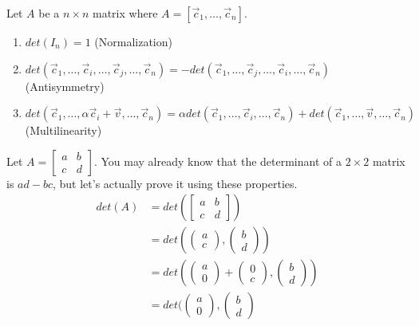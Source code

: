 Let $A$ be a $n\times n$ matrix where $A=[\vec{c}_1,\ldots,\vec{c}_n]$.
\begin{enumerate}
    \item $det(I_n)=1$ (Normalization)
    \item $det(\vec{c}_1,\ldots,\vec{c}_i,\ldots,\vec{c}_j,\ldots,\vec{c}_n)=-det(\vec{c}_1,\ldots,\vec{c}_j,\ldots,\vec{c}_i,\ldots,\vec{c}_n)$ (Antisymmetry)
    \item $det(\vec{c}_1,\ldots,
    \alpha\vec{c}_i+\vec{v},\ldots,\vec{c}_n)=\alpha det(\vec{c}_1,\ldots,
    \vec{c}_i,\ldots,\vec{c}_n)+det(\vec{c}_1,\ldots,
    \vec{v},\ldots,\vec{c}_n)$ (Multilinearity)
\end{enumerate}
\begin{example}
    Let $A=\begin{bmatrix}
        a & b \\
        c & d
    \end{bmatrix}$. You may already know that the determinant of a $2\times 2$ matrix is $ad-bc$, but let's actually prove it using these properties.
    \begin{align*}
        det(A)&=det(\begin{bmatrix}
        a & b \\
        c & d
    \end{bmatrix})\\
    &=det(\begin{pmatrix}
        a \\ c
    \end{pmatrix}, \begin{pmatrix}
        b \\ d
    \end{pmatrix})\\
    &=det(\begin{pmatrix}
        a \\ 0
    \end{pmatrix}+\begin{pmatrix}
        0 \\ c
    \end{pmatrix}, \begin{pmatrix}
        b \\ d
    \end{pmatrix})\\
    &=det(\begin{pmatrix}
        a \\ 0
    \end{pmatrix}, \begin{pmatrix}
        b \\ d

\end{pmatrix}
\end{align*}
\end{example}
